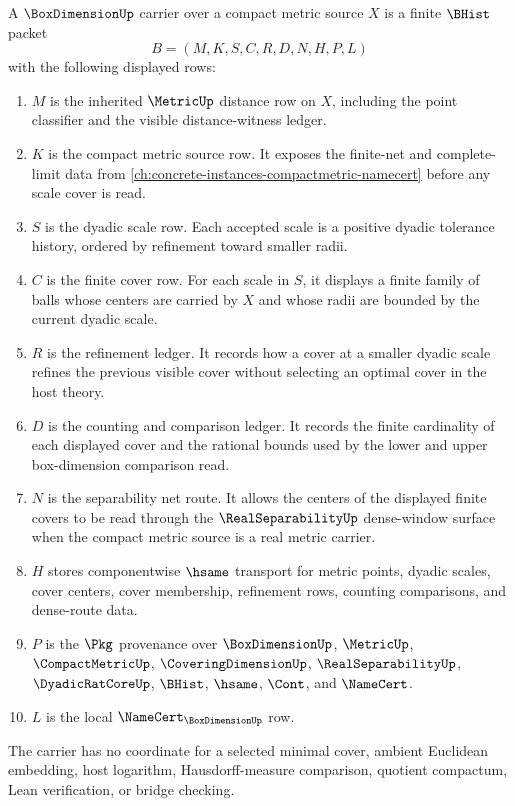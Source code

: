 \begin{definition}
\label{def:box-dimension-carrier}
A $\BoxDimensionUp$ carrier over a compact metric source $X$ is a finite $\BHist$ packet
$$
B=(M,K,S,C,R,D,N,H,P,L)
$$
with the following displayed rows:
\begin{enumerate}
\item $M$ is the inherited $\MetricUp$ distance row on $X$, including the point classifier and the visible distance-witness ledger.
\item $K$ is the compact metric source row. It exposes the finite-net and complete-limit data from \autoref{ch:concrete-instances-compactmetric-namecert} before any scale cover is read.
\item $S$ is the dyadic scale row. Each accepted scale is a positive dyadic tolerance history, ordered by refinement toward smaller radii.
\item $C$ is the finite cover row. For each scale in $S$, it displays a finite family of balls whose centers are carried by $X$ and whose radii are bounded by the current dyadic scale.
\item $R$ is the refinement ledger. It records how a cover at a smaller dyadic scale refines the previous visible cover without selecting an optimal cover in the host theory.
\item $D$ is the counting and comparison ledger. It records the finite cardinality of each displayed cover and the rational bounds used by the lower and upper box-dimension comparison read.
\item $N$ is the separability net route. It allows the centers of the displayed finite covers to be read through the $\RealSeparabilityUp$ dense-window surface when the compact metric source is a real metric carrier.
\item $H$ stores componentwise $\hsame$ transport for metric points, dyadic scales, cover centers, cover membership, refinement rows, counting comparisons, and dense-route data.
\item $P$ is the $\Pkg$ provenance over $\BoxDimensionUp$, $\MetricUp$, $\CompactMetricUp$, $\CoveringDimensionUp$, $\RealSeparabilityUp$, $\DyadicRatCoreUp$, $\BHist$, $\hsame$, $\Cont$, and $\NameCert$.
\item $L$ is the local $\NameCert_{\BoxDimensionUp}$ row.
\end{enumerate}
The carrier has no coordinate for a selected minimal cover, ambient Euclidean embedding, host logarithm, Hausdorff-measure comparison, quotient compactum, Lean verification, or bridge checking.
\end{definition}


